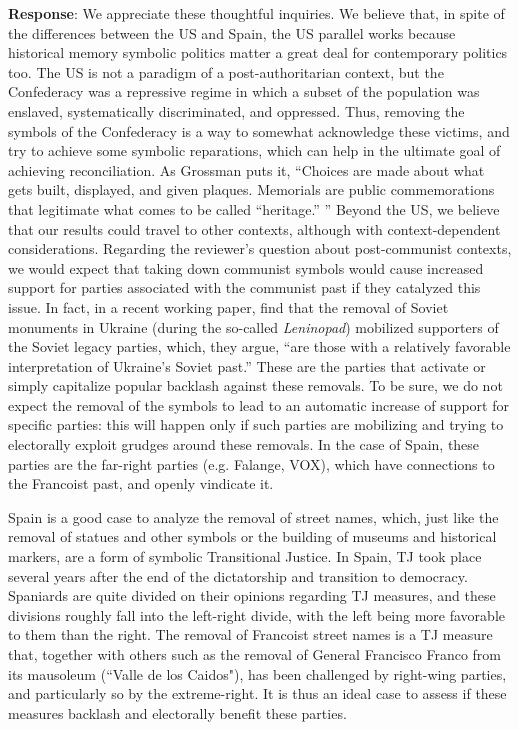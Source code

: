 \documentclass[12pt, a4paper, notitlepage]{article}
\begin{document}
\textbf{Response}: We appreciate these thoughtful inquiries. We believe that, in spite of the differences between the US and Spain, the US parallel works because historical memory symbolic politics matter a great deal for contemporary politics too. The US is not a paradigm of a post-authoritarian context, but the Confederacy was a repressive regime in which a subset of the population was enslaved, systematically discriminated, and oppressed. Thus, removing the symbols of the Confederacy is a way to somewhat acknowledge these victims, and try to achieve some symbolic reparations, which can help in the ultimate goal of achieving reconciliation.\citep{Walsh2020, Ward2021} As Grossman puts it, ``Choices are made about what gets built, displayed, and given plaques. Memorials are public commemorations that legitimate what comes to be called “heritage.” '' \citep{Grossman:2016}
Beyond the US, we believe that our results could travel to other contexts, although with context-dependent considerations. Regarding the reviewer's question about post-communist contexts, we would expect that taking down communist symbols would cause increased support for parties associated with the communist past if they catalyzed this issue. In fact, in a recent working paper, \citet{Rozenas:2021} find that the removal of Soviet monuments in Ukraine (during the so-called \textit{Leninopad}) mobilized supporters of the Soviet legacy parties, which, they argue, ``are those with a relatively favorable interpretation of Ukraine’s Soviet past.'' These are the parties that activate or simply capitalize popular backlash against these removals. To be sure, we do not expect the removal of the symbols to lead to an automatic increase of support for specific parties: this will happen only if such parties are mobilizing and trying to electorally exploit grudges around these removals. In the case of Spain, these parties are the far-right parties (e.g. Falange, VOX), which have connections to the Francoist past, and openly vindicate it.

Spain is a good case to analyze the removal of street names, which, just like the removal of statues and other symbols or the building of museums and historical markers, are a form of symbolic Transitional Justice.\citep{Ward2021, Balcells:2020aa} In Spain, TJ took place several years after the end of the dictatorship and transition to democracy.\citep{Aguilar:2002aa} Spaniards are quite divided on their opinions regarding TJ measures, and these divisions roughly fall into the left-right divide, with the left being more favorable to them than the right.\citep{Aguilar:2011aa} The removal of Francoist street names is a TJ measure that, together with others such as the removal of General Francisco Franco from its mausoleum (``Valle de los Caidos"), has been challenged by right-wing parties, and particularly so by the extreme-right. It is thus an ideal case to assess if these measures backlash and electorally benefit these parties.
\end{document}
